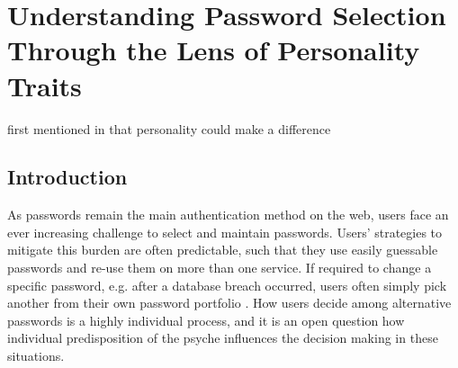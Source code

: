 \chapter[Password Selection and Personality Traits]{Understanding Password Selection Through the Lens of Personality Traits}\label{chap:pws_and_personality}

first mentioned in \cite{Weirich2001PrettyGoodPersuasion} that personality could make a difference


\section{Introduction}


As passwords remain the main authentication method on the web, users face an ever increasing challenge to select and maintain passwords. Users' strategies to mitigate this burden are often predictable, such that they use easily guessable passwords and re-use them on more than one service. If required to change a specific password, e.g. after a database breach occurred, users often simply pick another from their own password portfolio \cite{Bonneau2015ImperfectAuthentication, Florencio2014PasswordPortfoliosFiniteUser, Stobert2014PasswordLifeCycle}. How users decide among alternative passwords is a highly individual process, and it is an open question how individual predisposition of the psyche influences the decision making in these situations.


